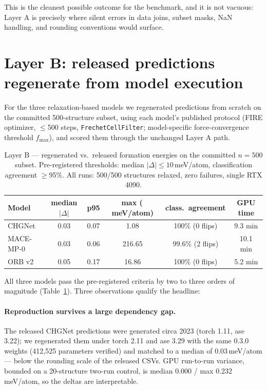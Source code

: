 \documentclass[11pt]{article}
\newcommand{\code}[1]{\texttt{#1}}
\newcommand{\meV}{\,meV/atom}
\begin{document}
This is the cleanest possible outcome for the benchmark, and it is not vacuous:
Layer A is precisely where silent errors in data joins, subset masks, NaN
handling, and rounding conventions would surface.

\section{Layer B: released predictions regenerate from model execution}

For the three relaxation-based models we regenerated predictions from scratch
on the committed 500-structure subset, using each model's published protocol
(FIRE optimizer, $\le$500 steps, \code{FrechetCellFilter}; model-specific
force-convergence threshold $f_\mathrm{max}$), and scored them through the
unchanged Layer A path.

\begin{table}[t]
\centering
\small
\caption{Layer B --- regenerated vs.\ released formation energies on the
committed $n{=}500$ subset. Pre-registered thresholds: median
$|\Delta| \le 10$\meV{}, classification agreement $\ge$95\%. All runs:
500/500 structures relaxed, zero failures, single RTX 4090.}
\label{tab:layer-b}
\begin{tabular}{lccccc}
\toprule
Model & median $|\Delta|$ & p95 & max (\meV) & class.\ agreement & GPU time \\
\midrule
CHGNet    & 0.03 & 0.07 & 1.08   & 100\% (0 flips) & 9.3 min \\
MACE-MP-0 & 0.03 & 0.06 & 216.65 & 99.6\% (2 flips) & 10.1 min \\
ORB v2    & 0.05 & 0.17 & 16.86  & 100\% (0 flips) & 5.2 min \\
\bottomrule
\end{tabular}
\end{table}

All three models pass the pre-registered criteria by two to three orders of
magnitude (Table~\ref{tab:layer-b}). Three observations qualify the headline:

\paragraph{Reproduction survives a large dependency gap.} The released CHGNet
predictions were generated circa 2023 (torch 1.11, ase 3.22); we regenerated
them under torch 2.11 and ase 3.29 with the same 0.3.0 weights (412{,}525
parameters verified) and matched to a median of 0.03\meV{} --- below the
rounding scale of the released CSVs. GPU run-to-run variance, bounded on a
20-structure two-run control, is median 0.000 / max 0.232\meV, so the deltas
are interpretable.
\end{document}
